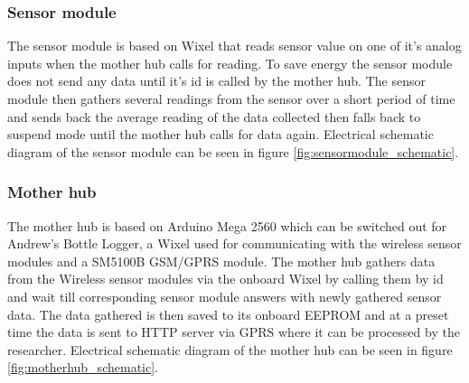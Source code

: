 \subsubsection{Sensor module}
The sensor module is based on Wixel\cite{wixel} that reads sensor value on one of it's
analog inputs when the mother hub calls for reading. To save energy the sensor module does
not send any data until it's id is called by the mother hub. The sensor module then 
gathers several readings from the sensor over a short period of time and sends back the 
average reading of the data collected then falls back to suspend mode until the mother 
hub calls for data again. Electrical schematic diagram of the sensor module can
be seen in figure \ref{fig:sensormodule_schematic}.
\subsubsection{Mother hub}
The mother hub is based on Arduino Mega 2560\cite{arduinoMega} which can be switched out 
for Andrew's Bottle Logger\cite{ALog-BottleLogger}, a Wixel\cite{wixel} used for 
communicating with the wireless sensor modules and a SM5100B GSM/GPRS 
module\cite{SM5100B}. The mother hub gathers data from the Wireless sensor modules via 
the onboard Wixel by calling them by id and wait till corresponding sensor module answers
with newly gathered sensor data. The data gathered is then saved to its onboard EEPROM
and at a preset time the data is sent to HTTP server via GPRS where it can be processed 
by the researcher. Electrical schematic diagram of the mother hub can be seen in figure 
\ref{fig:motherhub_schematic}.
